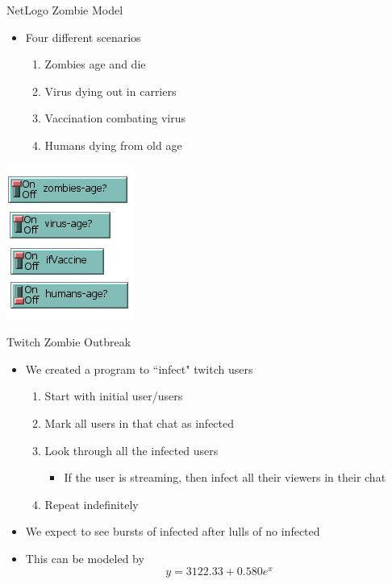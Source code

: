 \documentclass{beamer}
\begin{document}
\begin{frame}{NetLogo Zombie Model}
\begin{itemize}
\item Four different scenarios
\pause
\begin{enumerate}
\item Zombies age and die
\pause
\item Virus dying out in carriers
\pause
\item Vaccination combating virus
\pause
\item Humans dying from old age
\end{enumerate}
\end{itemize}
\begin{center}
\pause
\includegraphics[scale=0.5]{classes}
\end{center}
\end{frame}


\begin{frame}{Twitch Zombie Outbreak}
\begin{itemize}
\item We created a program to ``infect" twitch users
\pause
\begin{enumerate}
\item Start with initial user/users
\pause
\item Mark all users in that chat as infected
\pause
\item Look through all the infected users
\pause
\begin{itemize}
\item If the user is streaming, then infect all their viewers in their chat
\end{itemize}
\pause
\item Repeat indefinitely
\end{enumerate}
\pause
\item We expect to see bursts of infected after lulls of no infected
\pause
\item This can be modeled by
\[
y=3122.33 + 0.580e^{x}
\]
\end{itemize}
\end{frame}
\end{document}
